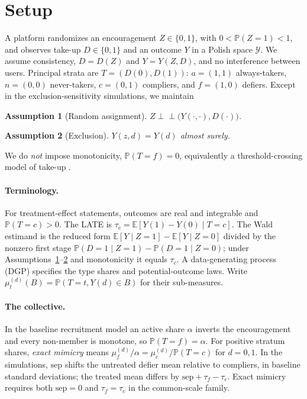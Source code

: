 \documentclass{article}
\newtheorem{assumption}{Assumption}
\theoremstyle{remark}
\newcommand{\Prob}{\mathbb{P}}
\newcommand{\E}{\mathbb{E}}
\newcommand{\Yspace}{\mathcal{Y}}
\newcommand{\indep}{\perp\!\!\!\perp}
\begin{document}
\section{Setup}\label{sec:setup}

A platform randomizes an encouragement $Z\in\{0,1\}$, with $0<\Prob(Z=1)<1$,
and observes take-up $D\in\{0,1\}$ and an outcome $Y$ in a Polish space $\Yspace$.
We assume consistency, $D=D(Z)$ and $Y=Y(Z,D)$, and no interference between
users. Principal strata are $T=(D(0),D(1))$: $a=(1,1)$ always-takers,
$n=(0,0)$ never-takers, $c=(0,1)$ compliers, and $f=(1,0)$ defiers. Except in
the exclusion-sensitivity simulations, we maintain
\begin{assumption}[Random assignment]\label{a1} $Z\indep\big(Y(\cdot,\cdot),D(\cdot)\big)$. \end{assumption}
\begin{assumption}[Exclusion]\label{a2} $Y(z,d)=Y(d)$ almost surely. \end{assumption}
We do \emph{not} impose monotonicity, $\Prob(T=f)=0$, equivalently a
threshold-crossing model of take-up \citep{vytlacil2002}.

\paragraph{Terminology.} For treatment-effect statements, outcomes are real and
integrable and $\Prob(T=c)>0$. The LATE is
$\tau_c=\E[Y(1)-Y(0)\mid T=c]$. The Wald estimand is the reduced form
$\E[Y\mid Z{=}1]-\E[Y\mid Z{=}0]$ divided by the nonzero first stage
$\Prob(D{=}1\mid Z{=}1)-\Prob(D{=}1\mid Z{=}0)$; under
Assumptions~\ref{a1}--\ref{a2} and monotonicity it equals $\tau_c$.
A data-generating process (DGP) specifies the type shares and potential-outcome
laws. Write $\mu_t^{(d)}(B)=\Prob(T=t,Y(d)\in B)$ for their sub-measures.

\paragraph{The collective.} In the baseline recruitment model an active share
$\alpha$ inverts the encouragement and every non-member is monotone, so
$\Prob(T=f)=\alpha$. For positive stratum shares, \emph{exact mimicry} means
$\mu_f^{(d)}/\alpha=\mu_c^{(d)}/\Prob(T=c)$ for $d=0,1$.
In the simulations, $\mathrm{sep}$ shifts the untreated defier mean relative
to compliers, in baseline standard deviations; the treated mean differs by
$\mathrm{sep}+\tau_f-\tau_c$. Exact mimicry requires both
$\mathrm{sep}=0$ and $\tau_f=\tau_c$ in the common-scale family.
\end{document}
